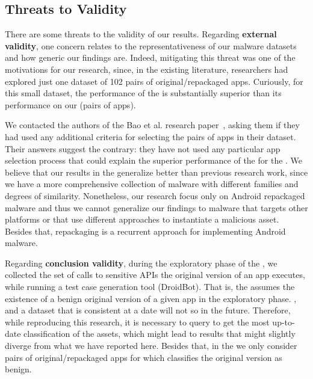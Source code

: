 \subsection{Threats to Validity}\label{sec:threats}


There are some threats to the validity of our results.
Regarding {\bf external validity}, one concern relates to the 
representativeness of our malware datasets and how generic our findings are.
Indeed, mitigating this threat was one of the motivations for our research,
since, in the existing literature, researchers had explored just
one dataset of 102 pairs of original/repackaged apps. Curiously,
for this small dataset, the performance of the
\mas is substantially superior
than its performance on our \cds (\apps pairs of
apps).

We contacted the authors of the Bao et al. research paper~\cite{DBLP:conf/wcre/BaoLL18}, asking them
if they had used any additional criteria for selecting the pairs of apps in their
dataset. Their answers suggest the contrary: they have not used
any particular app selection process that
could explain the superior performance of the \mas for the \sds. We believe that
our results in the \cds generalize better than previous research work,
since we have a more comprehensive collection of malware with different
families and degrees of similarity. Nonetheless, our
research focus only on Android repackaged malware and thus we cannot generalize
our findings to malware that targets other platforms or that use different approaches
to instantiate a malicious asset. Besides that, repackaging is a recurrent approach
for implementing Android malware.


Regarding {\bf conclusion validity}, during the exploratory phase of the \mas, we collected the set of calls to sensitive APIs the original version of
an app executes, while running a test case generation tool (DroidBot).
That is, the \mas assumes the existence of a benign original
version of a given app in the exploratory phase. , and a dataset that is consistent at a date will
not so in the future.
Therefore, while reproducing this research, it is necessary to query \vt to get the most up-to-date classification of the assets, which might lead to results that might slightly
diverge from what we have reported here. Besides that, in the \cds we only consider
pairs of original/repackaged apps for which \vt classifies the original version as benign. 

